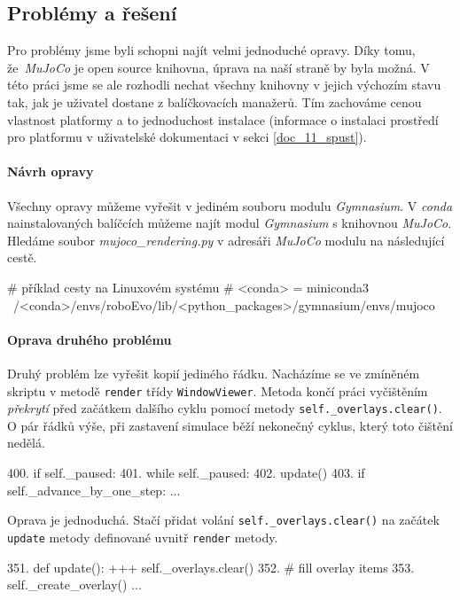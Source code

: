\subsection{Problémy a řešení}
Pro problémy jsme byli schopni najít velmi jednoduché opravy. Díky tomu,
že~\emph{MuJoCo} je open source knihovna, úprava na naší straně by byla možná.
V této práci jsme se ale rozhodli nechat všechny knihovny v jejich výchozím
stavu tak, jak je uživatel dostane z balíčkovacích manažerů. Tím zachováme
cenou vlastnost platformy a to jednoduchost instalace (informace o instalaci
prostředí pro platformu v uživatelské dokumentaci v sekci \ref{doc_11_spust}).

\paragraph{Návrh opravy}
Všechny opravy můžeme vyřešit v jediném souboru modulu \emph{Gymnasium}.
V \emph{conda} nainstalovaných balíčcích můžeme najít modul \emph{Gymnasium} s
knihovnou \emph{MuJoCo}. Hledáme soubor \emph{mujoco\_rendering.py} v adresáři
\emph{MuJoCo} modulu na následující cestě. 
\begin{code}
# příklad cesty na Linuxovém systému
# <conda> = miniconda3
~/<conda>/envs/roboEvo/lib/<python_packages>/gymnasium/envs/mujoco
\end{code}

\paragraph{Oprava druhého problému}
Druhý problém lze vyřešit kopií jediného řádku. Nacházíme se ve
zmíněném skriptu v metodě \texttt{render} třídy \texttt{WindowViewer}. Metoda
končí práci vyčištěním \emph{překrytí} před začátkem dalšího cyklu pomocí
metody \texttt{self.\_overlays.clear()}. O pár řádků výše, při zastavení
simulace běží nekonečný cyklus, který toto čištění nedělá. 
\begin{code}
400.  if self._paused:                       
401.      while self._paused:                
402.          update()                      
403.          if self._advance_by_one_step:
...
\end{code}
Oprava je jednoduchá. Stačí přidat volání \texttt{self.\_overlays.clear()} na
začátek \texttt{update} metody definované uvnitř \texttt{render} metody.
\begin{code}
351.  def update():
+++       self._overlays.clear()
352.      # fill overlay items
353.      self._create_overlay()
...
\end{code}

